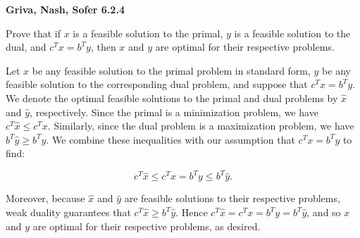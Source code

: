 \textbf{Griva, Nash, Sofer 6.2.4}

Prove that if $x$ is a feasible solution to the primal, $y$ is a feasible solution to the dual, and $c^Tx = b^Ty$, then
$x$ and $y$ are optimal for their respective problems.

\begin{solution}
  Let $x$ be any feasible solution to the primal problem in standard form, $y$ be any feasible solution to the 
  corresponding dual problem, and suppose that $c^Tx = b^Ty$. We denote the optimal feasible solutions to the primal and
  dual problems by $\hat{x}$ and $\hat{y}$, respectively. Since the primal is a minimization problem, we have 
  $c^T\hat{x} \le c^Tx$. Similarly, since the dual problem is a maximization problem, we have $b^T \hat{y} \ge b^T y$. 
  We combine these inequalities with our assumption that $c^Tx = b^Ty$ to find:

  $$
  c^T \hat{x} \le c^T x = b^T y \le b^T \hat{y}.
  $$

  Moreover, because $\hat{x}$ and $\hat{y}$ are feasible solutions to their respective problems, weak duality guarantees
  that $c^T \hat{x} \ge b^T \hat{y}$. Hence $c^T \hat{x} = c^T x = b^T y = b^T \hat{y}$, and so $x$ and $y$ are optimal
  for their respective problems, as desired.
  \ \\
\end{solution}
